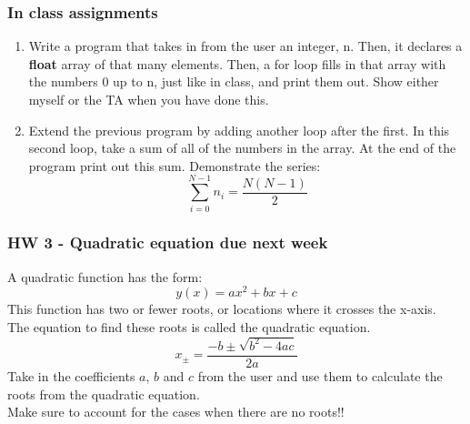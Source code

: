 \documentclass{beamer}
\begin{document}
\begin{frame}
  \frametitle{In class assignments}
  \begin{enumerate}
    \item Write a program that takes in from the user an integer, n. Then, it declares a \textbf{float} array
      of that many elements. Then, a for loop fills in that array with the numbers 0 up to n, 
      just like in class, and print them out. 
      Show either myself or the TA when you have done this.
    \item Extend the previous program by adding another loop after the first. 
      In this second loop, take a sum of all of the numbers in the array. 
      At the end of the program print out this sum. Demonstrate the series:
      \begin{equation*}
	\sum_{i=0}^{N-1} n_i = \frac{N(N-1)}{2}
      \end{equation*}
  \end{enumerate}
\end{frame}

\begin{frame}
  \frametitle{HW 3 - Quadratic equation due next week}
  A quadratic function has the form:
  \begin{equation*}
    y(x) = ax^2 + bx + c
  \end{equation*}
  This function has two or fewer roots, or locations 
  where it crosses the x-axis.\\
  The equation to find these roots is called the quadratic equation.
  \begin{equation*}
    x_\pm = \frac{-b\pm\sqrt{b^2-4ac}}{2a}
  \end{equation*}
  Take in the coefficients $a$, $b$ and $c$ from the user and use them
  to calculate the roots from the quadratic equation.\\
  Make sure to account for the cases when there are no roots!!
\end{frame}
\end{document}
